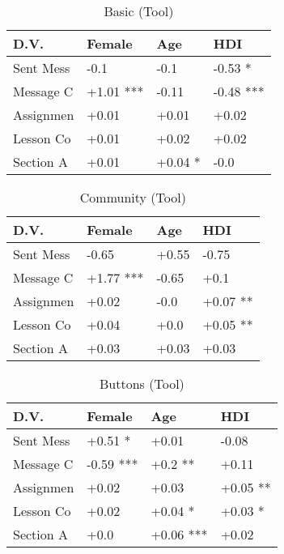 \begin{table}[t]
\begin{center}
\begin{tabularx}{\columnwidth}{lXXX}
\toprule
D.V. & Female & Age & HDI \\
\midrule
Sent Mess & -0.1 & -0.1 & -0.53 * \\
Message C & +1.01 *** & -0.11 & -0.48 *** \\
Assignmen & +0.01 & +0.01 & +0.02 \\
Lesson Co & +0.01 & +0.02 & +0.02 \\
Section A & +0.01 & +0.04 * & -0.0 \\
\bottomrule
\end{tabularx}
\end{center}
\caption{Basic (Tool)}
\label{tab:demo_table}
\end{table}

\begin{table}[t]
\begin{center}
\begin{tabularx}{\columnwidth}{lXXX}
\toprule
D.V. & Female & Age & HDI \\
\midrule
Sent Mess & -0.65 & +0.55 & -0.75 \\
Message C & +1.77 *** & -0.65 & +0.1 \\
Assignmen & +0.02 & -0.0 & +0.07 ** \\
Lesson Co & +0.04 & +0.0 & +0.05 ** \\
Section A & +0.03 & +0.03 & +0.03 \\
\bottomrule
\end{tabularx}
\end{center}
\caption{Community (Tool)}
\label{tab:demo_table}
\end{table}

\begin{table}[t]
\begin{center}
\begin{tabularx}{\columnwidth}{lXXX}
\toprule
D.V. & Female & Age & HDI \\
\midrule
Sent Mess & +0.51 * & +0.01 & -0.08 \\
Message C & -0.59 *** & +0.2 ** & +0.11 \\
Assignmen & +0.02 & +0.03 & +0.05 ** \\
Lesson Co & +0.02 & +0.04 * & +0.03 * \\
Section A & +0.0 & +0.06 *** & +0.02 \\
\bottomrule
\end{tabularx}
\end{center}
\caption{Buttons (Tool)}
\label{tab:demo_table}
\end{table}

